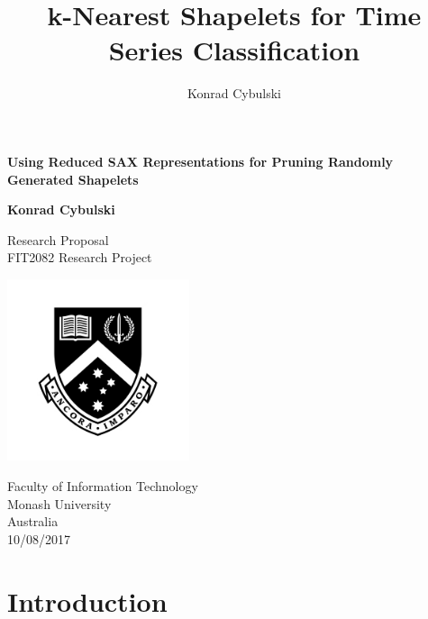 \documentclass[10pt,a4paper]{article}
\author{Konrad Cybulski}
\title{k-Nearest Shapelets for Time Series Classification}
\begin{document}
\begin{titlepage}
    \begin{center}
        \vspace*{1cm}
        
        \LARGE
        \textbf{Using Reduced SAX Representations for Pruning Randomly Generated Shapelets}
        
        \vspace{4cm}
        
		\Large 
        
        \textbf{Konrad Cybulski}
        
        
        \LARGE
        \vspace{2cm}

        
        
        \vfill
        
        
        
        Research Proposal \\
        FIT2082 Research Project
        
        
        \includegraphics[width=0.4\textwidth]{Images/monash_emblem.jpg}
              
        
        \large
        Faculty of Information Technology\\
        Monash University\\
        Australia\\
        10/08/2017
        
    \end{center}
\end{titlepage}

\pagebreak
\tableofcontents
\pagebreak

\section{Introduction} 
\end{document}

